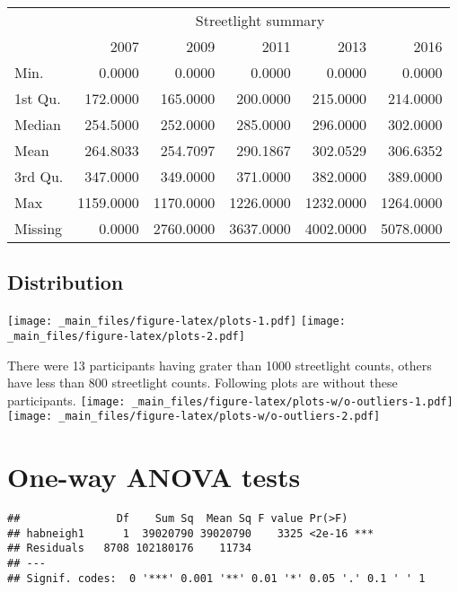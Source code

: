 \documentclass[
]{book}
\begin{document}
\begin{table}
\centering\begingroup\fontsize{15}{17}\selectfont

\begin{tabular}{lrrrrr}
\toprule
\multicolumn{1}{c}{ } & \multicolumn{5}{c}{Streetlight summary} \\
\cmidrule(l{3pt}r{3pt}){2-6}
  & 2007 & 2009 & 2011 & 2013 & 2016\\
\midrule
Min. & 0.0000 & 0.0000 & 0.0000 & 0.0000 & 0.0000\\
1st Qu. & 172.0000 & 165.0000 & 200.0000 & 215.0000 & 214.0000\\
Median & 254.5000 & 252.0000 & 285.0000 & 296.0000 & 302.0000\\
Mean & 264.8033 & 254.7097 & 290.1867 & 302.0529 & 306.6352\\
3rd Qu. & 347.0000 & 349.0000 & 371.0000 & 382.0000 & 389.0000\\
\addlinespace
Max & 1159.0000 & 1170.0000 & 1226.0000 & 1232.0000 & 1264.0000\\
Missing & 0.0000 & 2760.0000 & 3637.0000 & 4002.0000 & 5078.0000\\
\bottomrule
\end{tabular}
\endgroup{}
\end{table}

\hypertarget{distribution}{%
\subsection{Distribution}\label{distribution}}

\texttt{[image: \_main\_files/figure-latex/plots-1.pdf]} \texttt{[image: \_main\_files/figure-latex/plots-2.pdf]}

There were 13 participants having grater than 1000 streetlight counts, others have less than 800 streetlight counts.
Following plots are without these participants.
\texttt{[image: \_main\_files/figure-latex/plots-w/o-outliers-1.pdf]} \texttt{[image: \_main\_files/figure-latex/plots-w/o-outliers-2.pdf]}

\hypertarget{one-way-anova-tests}{%
\section{One-way ANOVA tests}\label{one-way-anova-tests}}

\begin{verbatim}
##               Df    Sum Sq  Mean Sq F value Pr(>F)    
## habneigh1      1  39020790 39020790    3325 <2e-16 ***
## Residuals   8708 102180176    11734                   
## ---
## Signif. codes:  0 '***' 0.001 '**' 0.01 '*' 0.05 '.' 0.1 ' ' 1
\end{verbatim}
\end{document}
